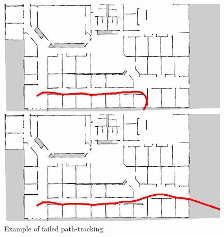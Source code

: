 \begin{figure}[h]
  \begin{minipage}[b]{0.45\linewidth}
    \centering
    \includegraphics[keepaspectratio, scale=0.35]{images/exp3/traject30.png}
    \subcaption{}
  \end{minipage}
  \begin{minipage}[b]{0.45\linewidth}
    \centering
    \includegraphics[keepaspectratio, scale=0.35]{images/exp3/traject25.png}
    \subcaption{}
  \end{minipage}
\caption{Example of failed path-tracking}
\label{Fig:fail3}
\end{figure}

